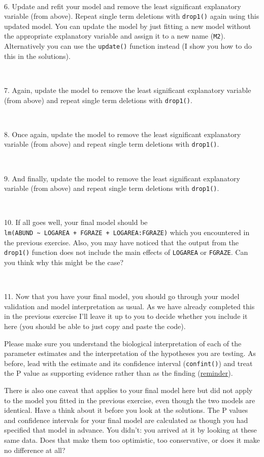 \documentclass[
]{article}
\begin{document}
~

6. Update and refit your model and remove the least significant
explanatory variable (from above). Repeat single term deletions with
\texttt{drop1()} again using this updated model. You can update the
model by just fitting a new model without the appropriate explanatory
variable and assign it to a new name (\texttt{M2}). Alternatively you
can use the \texttt{update()} function instead (I show you how to do
this in the solutions).

~

7. Again, update the model to remove the least significant explanatory
variable (from above) and repeat single term deletions with
\texttt{drop1()}.

~

8. Once again, update the model to remove the least significant
explanatory variable (from above) and repeat single term deletions with
\texttt{drop1()}.

~

9. And finally, update the model to remove the least significant
explanatory variable (from above) and repeat single term deletions with
\texttt{drop1()}.

~

10. If all goes well, your final model should be
\texttt{lm(ABUND\ \textasciitilde{}\ LOGAREA\ +\ FGRAZE\ +\ LOGAREA:FGRAZE)}
which you encountered in the previous exercise. Also, you may have
noticed that the output from the \texttt{drop1()} function does not
include the main effects of \texttt{LOGAREA} or \texttt{FGRAZE}. Can you
think why this might be the case?

~

11. Now that you have your final model, you should go through your model
validation and model interpretation as usual. As we have already
completed this in the previous exercise I'll leave it up to you to
decide whether you include it here (you should be able to just copy and
paste the code).

Please make sure you understand the biological interpretation of each of
the parameter estimates and the interpretation of the hypotheses you are
testing. As before, lead with the estimate and its confidence interval
(\texttt{confint()}) and treat the P value as supporting evidence rather
than as the finding
(\href{https://alexd106.github.io/EV5020/linear_model_1_exercise.html\#pval_note}{reminder}).

There is also one caveat that applies to your final model here but did
not apply to the model you fitted in the previous exercise, even though
the two models are identical. Have a think about it before you look at
the solutions. The P values and confidence intervals for your final
model are calculated as though you had specified that model in advance.
You didn't: you arrived at it by looking at these same data. Does that
make them too optimistic, too conservative, or does it make no
difference at all?
\end{document}
